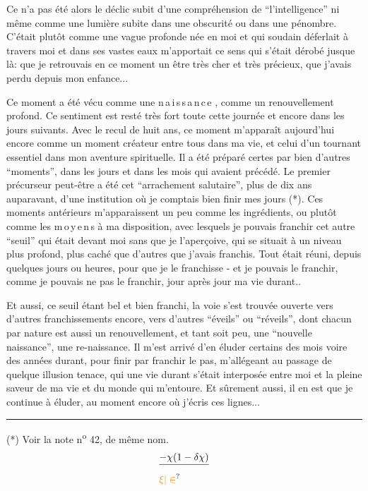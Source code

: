 Ce n'a pas été alors le déclic subit d'une compréhension de ``l'intelligence''\handwritten{,} ni même comme une lumière subite dans une obscurité ou dans une pénombre. C'était plutôt comme une vague profonde née en moi et qui soudain déferlait à travers moi et dans ses vastes eaux m'apportait ce sens qui s'était dérobé jusque là: que je retrouvais en ce moment un être très cher et très précieux, que j'avais perdu depuis mon enfance...

Ce moment a été vécu comme une n\,a\,i\,s\,s\,a\,n\,c\,e , comme un renouvellement profond. Ce sentiment est resté très fort toute cette journée\handwritten{,} et encore dans les jours suivants. Avec le recul de huit ans, ce moment m'apparaît aujourd'hui encore comme un moment créateur entre tous dans ma vie, et celui d'un tournant essentiel dans mon aventure spirituelle. Il a été préparé certes par bien d'autres ``moments'', dans les jours et dans les mois qui avaient précédé. Le premier précurseur peut-être a été cet ``arrachement salutaire'', plus de dix ans auparavant, d'une institution où je comptais bien finir mes jours (*). Ces moments antérieurs m'apparaissent un peu comme les ingrédients, ou plutôt comme les m\unsure{\textperiodcentered|}\,o\,y\,e\,n\,s à ma disposition, avec lesquels je pouvais franchir cet autre ``seuil'' qui était devant moi sans que je l'aperçoive, qui se situait à un niveau plus profond, plus caché que d'autres que j'avais franchis. Tout était réuni, depuis quelques jours ou heures, pour que je le franchisse - et je pouvais le franchir, comme je pouvais ne pas le franchir, jour après jour ma vie durant..

Et aussi, ce seuil étant bel et bien franchi, la voie s'est trouvée ouverte vers d'autres franchissements encore, vers d'autres ``éveils'' ou ``réveils'', dont chacun par nature est aussi un renouvellement, et tant soit peu, une \unsure{:|}``nouvelle naissance'', une re-naissance. Il m'est arrivé d'en éluder certains des mois voire des années durant, pour finir par franchir le pas, m'allégeant au passage de quelque illusion tenace, qui une vie durant s'était interposée entre moi et la pleine saveur de ma vie et du monde qui m'entoure. Et sûrement aussi, il en est que je continue à éluder, au moment encore où j'écris ces lignes...

\noindent\rule{5em}{0.3pt}\par
(*) Voir la note n\textsuperscript{o} 42, de même nom.
\[
\begin{aligned}
&\deleted{-\chi(1-\delta\chi)}\\
&\unsure{\xi|\in}
\end{aligned}
\]

